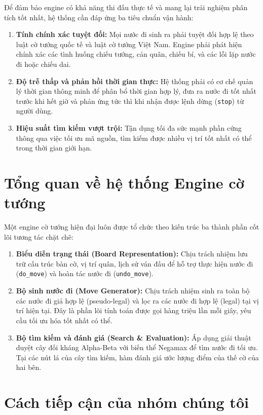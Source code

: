Để đảm bảo engine có khả năng thi đấu thực tế và mang lại trải nghiệm phân tích tốt nhất, hệ thống cần đáp ứng ba tiêu chuẩn vận hành:
\begin{enumerate}
    \item \textbf{Tính chính xác tuyệt đối:} Mọi nước đi sinh ra phải tuyệt đối hợp lệ theo luật cờ tướng quốc tế và luật cờ tướng Việt Nam. Engine phải phát hiện chính xác các tình huống chiếu tướng, cản quân, chiếu bí, và các lỗi lặp nước đi hoặc chiếu dai.
    \item \textbf{Độ trễ thấp và phản hồi thời gian thực:} Hệ thống phải có cơ chế quản lý thời gian thông minh để phân bổ thời gian hợp lý, đưa ra nước đi tốt nhất trước khi hết giờ và phản ứng tức thì khi nhận được lệnh dừng (\texttt{stop}) từ người dùng.
    \item \textbf{Hiệu suất tìm kiếm vượt trội:} Tận dụng tối đa sức mạnh phần cứng thông qua việc tối ưu mã nguồn, tìm kiếm được nhiều vị trí tốt nhất có thể trong thời gian giới hạn.
\end{enumerate}

\section{Tổng quan về hệ thống Engine cờ tướng}

Một engine cờ tướng hiện đại luôn được tổ chức theo kiến trúc ba thành phần cốt lõi tương tác chặt chẽ:

\begin{enumerate}
    \item \textbf{Biểu diễn trạng thái (Board Representation):} Chịu trách nhiệm lưu trữ cấu trúc bàn cờ, vị trí quân, lịch sử ván đấu để hỗ trợ thực hiện nước đi (\texttt{do\_move}) và hoàn tác nước đi (\texttt{undo\_move}).
    \item \textbf{Bộ sinh nước đi (Move Generator):} Chịu trách nhiệm sinh ra toàn bộ các nước đi giả hợp lệ (pseudo-legal) và lọc ra các nước đi hợp lệ (legal) tại vị trí hiện tại. Đây là phần lõi tính toán được gọi hàng triệu lần mỗi giây, yêu cầu tối ưu hóa tốt nhất có thể.
    \item \textbf{Bộ tìm kiếm và đánh giá (Search \& Evaluation):} Áp dụng giải thuật duyệt cây đối kháng Alpha-Beta với biến thể Negamax để tìm nước đi tối ưu. Tại các nút lá của cây tìm kiếm, hàm đánh giá ước lượng điểm của thế cờ của hai bên.
\end{enumerate}

\section{Cách tiếp cận của nhóm chúng tôi}

